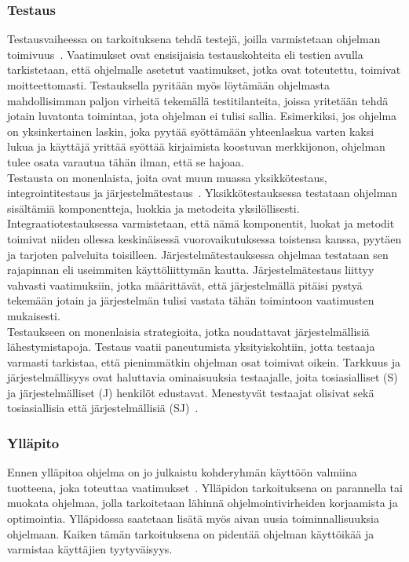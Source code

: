 \documentclass[finnish]{../tktltiki2}
\theoremstyle{definition}
\theoremstyle{remark}
\begin{document}
\subsubsection{Testaus}

Testausvaiheessa on tarkoituksena tehdä testejä, joilla varmistetaan ohjelman toimivuus~\cite{SWEBOK:409902}. Vaatimukset ovat ensisijaisia
testauskohteita eli testien avulla tarkistetaan, että ohjelmalle asetetut vaatimukset, jotka ovat toteutettu, toimivat
moitteettomasti. Testauksella pyritään myös löytämään ohjelmasta mahdollisimman paljon virheitä tekemällä testitilanteita, joissa yritetään
tehdä jotain luvatonta toimintaa, jota ohjelman ei tulisi sallia. Esimerkiksi, jos ohjelma on yksinkertainen laskin,
joka pyytää syöttämään yhteenlaskua varten kaksi lukua ja käyttäjä yrittää syöttää kirjaimista koostuvan merkkijonon, ohjelman
tulee osata varautua tähän ilman, että se hajoaa.\\

Testausta on monenlaista, joita ovat muun muassa yksikkötestaus,
integrointitestaus ja järjestelmätestaus~\cite{Capretz:2010:MSS:1726559.1726574}.
Yksikkötestauksessa testataan ohjelman sisältämiä komponentteja, luokkia
ja metodeita yksilöllisesti. Integraatiotestauksessa varmistetaan, että nämä komponentit, luokat ja metodit toimivat niiden ollessa keskinäisessä vuorovaikutuksessa toistensa kanssa, pyytäen ja tarjoten palveluita toisilleen. Järjestelmätestauksessa ohjelmaa testataan sen rajapinnan eli useimmiten käyttöliittymän kautta. Järjestelmätestaus liittyy vahvasti vaatimuksiin, jotka määrittävät, että järjestelmällä pitäisi pystyä tekemään jotain ja järjestelmän tulisi vastata tähän toimintoon vaatimusten mukaisesti.\\

Testaukseen on monenlaisia strategioita, jotka noudattavat järjestelmälli\-siä lähestymistapoja. Testaus vaatii paneutumista yksityiskohtiin, jotta testaaja varmasti tarkistaa, että pienimmätkin ohjelman osat toimivat oikein. Tarkkuus ja järjestelmällisyys ovat
haluttavia ominaisuuksia testaajalle, joita tosiasialliset (S) ja järjestelmälliset (J) henkilöt edustavat. Menestyvät testaajat olisivat sekä tosiasiallisia että järjestelmällisiä (SJ)~\cite{Capretz:2010:MSS:1726559.1726574}.

\subsubsection{Ylläpito}

Ennen ylläpitoa ohjelma on jo julkaistu kohderyhmän käyttöön valmiina tuotteena, joka toteuttaa vaatimukset~\cite{SWEBOK:409902}. Ylläpidon
tarkoituksena on parannella tai muokata ohjelmaa, jolla tarkoitetaan lähinnä ohjelmointivirheiden
korjaamista ja optimointia. Ylläpidossa saatetaan lisätä myös aivan uusia toiminnallisuuksia
ohjelmaan. Kaiken tämän tarkoituksena on pidentää ohjelman käyttöikää ja varmistaa käyttäjien
tyytyväisyys.\\
\end{document}
